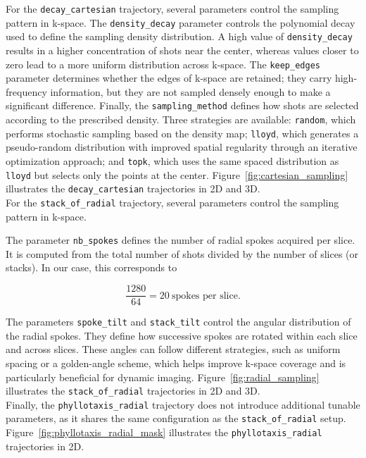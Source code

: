 \documentclass[12pt]{article}
\begin{document}
For the \texttt{decay\_cartesian} trajectory, several parameters control the sampling pattern in k-space.
The \texttt{density\_decay} parameter controls the polynomial decay used to define the sampling density distribution.
A high value of \texttt{density\_decay} results in a higher concentration of shots near the center, whereas values closer to zero lead to a more uniform distribution across k-space.
The \texttt{keep\_edges} parameter determines whether the edges of k-space are retained; they carry high-frequency information, but they are not sampled densely enough to make a significant difference.
Finally, the \texttt{sampling\_method} defines how shots are selected according to the prescribed density.
Three strategies are available: \texttt{random}, which performs stochastic sampling based on the density map; \texttt{lloyd}, which generates a pseudo-random distribution with improved spatial regularity through an iterative optimization approach; and \texttt{topk}, which uses the same spaced distribution as \texttt{lloyd} but selects only the points at the center.
Figure~\ref{fig:cartesian_sampling} illustrates the \texttt{decay\_cartesian} trajectories in 2D and 3D.
\mbox{}\\

For the \texttt{stack\_of\_radial} trajectory, several parameters control the sampling pattern in k-space.

The parameter \texttt{nb\_spokes} defines the number of radial spokes acquired per slice. 
It is computed from the total number of shots divided by the number of slices (or stacks). 
In our case, this corresponds to

\[
\frac{1280}{64} = 20 \ \text{spokes per slice}.
\]

The parameters \texttt{spoke\_tilt} and \texttt{stack\_tilt} control the angular distribution of the radial spokes. 
They define how successive spokes are rotated within each slice and across slices. 
These angles can follow different strategies, such as uniform spacing or a golden-angle scheme, which helps improve k-space coverage and is particularly beneficial for dynamic imaging.
Figure~\ref{fig:radial_sampling} illustrates the \texttt{stack\_of\_radial} trajectories in 2D and 3D.
\mbox{}\\


Finally, the \texttt{phyllotaxis\_radial} trajectory does not introduce additional tunable parameters, as it shares the same configuration as the \texttt{stack\_of\_radial} setup.
Figure~\ref{fig:phyllotaxis_radial_mask} illustrates the \texttt{phyllotaxis\_radial} trajectories in 2D.
\end{document}
